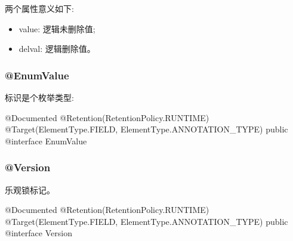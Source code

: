 两个属性意义如下:
\begin{itemize}
    \item value: 逻辑未删除值;
    \item delval: 逻辑删除值。
\end{itemize}


\subsubsection{@EnumValue}

标识是个枚举类型:

\begin{Java}
@Documented
@Retention(RetentionPolicy.RUNTIME)
@Target({ElementType.FIELD, ElementType.ANNOTATION_TYPE})
public @interface EnumValue { }
\end{Java}

\subsubsection{@Version}

乐观锁标记。

\begin{Java}
@Documented
@Retention(RetentionPolicy.RUNTIME)
@Target({ElementType.FIELD, ElementType.ANNOTATION_TYPE})
public @interface Version { }
\end{Java}